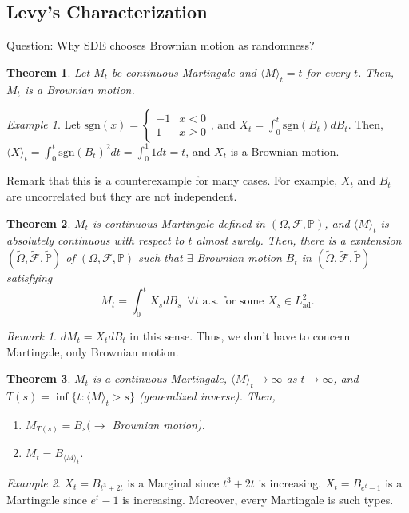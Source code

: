 \documentclass[12pt]{report}
\renewcommand{\P}{\mathbb{P}}
\newcommand{\F}{\mathcal{F}}
\renewcommand{\1}{\mathbb{1}}
\renewcommand{\O}{\Omega}
\theoremstyle{break}
\newtheorem{thm}{Theorem}[section] %
\theoremstyle{newdef}
\theoremstyle{remark}
\newtheorem*{exmp}{Example} %
\newtheorem*{rem}{Remark} %
\begin{document}
\begin{appendices}
\section{Levy's Characterization}
Question: Why SDE chooses Brownian motion as randomness?

\begin{thm}
Let $M_t$ be continuous Martingale and $\langle M \rangle_t = t$ for every $t$.
Then, $M_t$ is a Brownian motion.
\end{thm}

\begin{exmp}
Let $\text{sgn}(x) = \begin{cases}-1 & x < 0\\ 1 & x \geq 0\end{cases}$,
and $X_t = \int_0^t \text{sgn}(B_t)dB_t$.
Then, $\langle X \rangle_t = \int_0^t \text{sgn}(B_t)^2 dt = \int_0^1 1 dt = t$, and $X_t$ is a Brownian motion.
\end{exmp}

Remark that this is a counterexample for many cases.
For example, $X_t$ and $B_t$ are uncorrelated but they are not independent.

\begin{thm}
$M_t$ is continuous Martingale defined in $(\O,\F,\P)$,
and $\langle M\rangle_t$ is absolutely continuous with respect to $t$ almost surely.
Then, there is a exntension $(\widetilde{\O},\widetilde{\F},\widetilde{\P})$ of $(\O,\F,\P)$ such that
$\exists$ Brownian motion $B_t$ in $(\widetilde{\O},\widetilde{\F},\widetilde{\P})$ satisfying
\[M_t = \int_0^t X_s dB_s \enspace \forall t \text{ a.s. for some } X_s \in L^2_{\text{ad}}.\]
\end{thm}

\begin{rem}
$dM_t = X_t dB_t$ in this sense.
Thus, we don't have to concern Martingale, only Brownian motion.
\end{rem}

\begin{thm}
$M_t$ is a continuous Martingale, $\langle M \rangle_t \rightarrow \infty$ as $t \rightarrow \infty$, and $T(s) = \inf \{ t : \langle M \rangle_t > s \}$ (generalized inverse).
Then,
\begin{enumerate}
\item
$M_{T(s)} = B_s (\rightarrow$ Brownian motion).

\item
$M_t = B_{\langle M \rangle_t}$.

\end{enumerate}
\end{thm}
\begin{exmp}
$X_t = B_{t^3 + 2t}$ is a Marginal since $t^3 + 2t$ is increasing.
$X_t = B_{e^t - 1}$ is a Martingale since $e^t - 1$ is increasing.
Moreover, every Martingale is such types.
\end{exmp}


\end{appendices}
\end{document}

